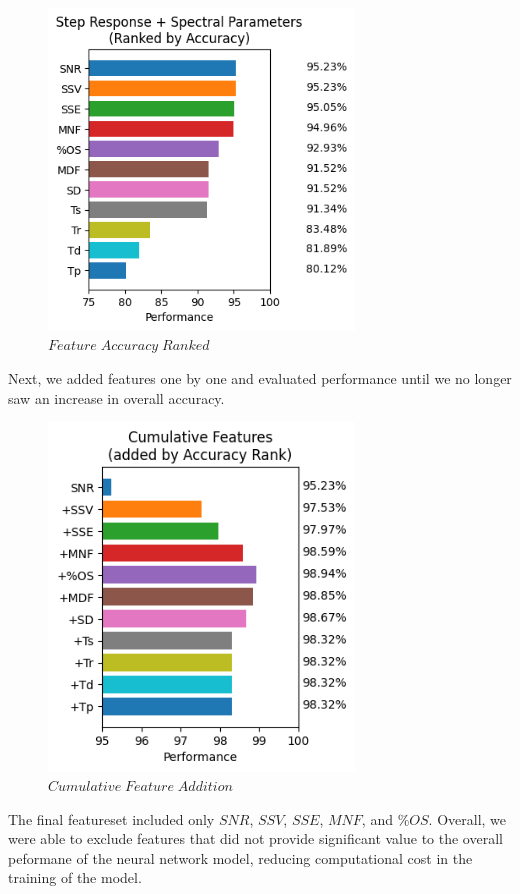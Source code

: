 \documentclass[conference]{IEEEtran}
\begin{document}
\begin{figure}[htb]
\centering
\includegraphics[width=3.2in]{figures/90_m2rank.png}
\caption{$Feature\;Accuracy\;Ranked$}
\label{fig:Rank}
\end{figure}

Next, we added features one by one and evaluated performance until we no longer saw an increase in overall accuracy.

\begin{figure}[htb]
\centering
\includegraphics[width=3.2in]{figures/91_m2cumsum.png}
\caption{$Cumulative\;Feature\;Addition$}
\label{fig:CumRank}
\end{figure}

The final featureset included only $SNR$, $SSV$, $SSE$, $MNF$, and $\%OS$. Overall, we were able to exclude features that did not provide significant value to the overall peformane of the neural network model, reducing computational cost in the training of the model.
\end{document}
